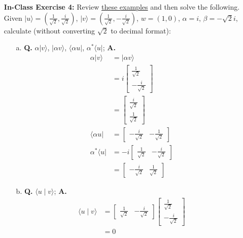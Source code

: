 \documentclass[main.tex]{subfiles}
\begin{document}
\begin{enumerate}
\item[] \textbf{In-Class Exercise 4:} Review \href{https://www2.seas.gwu.edu/~simhaweb/quantum/modules/module2/problems2.html#vectors}{these examples} and then solve the following. Given $|u\rangle=\left(\frac{1}{\sqrt{2}}, \frac{i}{\sqrt{2}}\right)$, $|v\rangle=\left(\frac{1}{\sqrt{2}}, -\frac{i}{\sqrt{2}}\right)$, $w=(1,0)$, $\alpha=i$, $\beta=-\sqrt{2}i$, calculate (without converting $\sqrt{2}$ to decimal format):

    \begin{enumerate}
        \item[a.] \textbf{Q.} $\alpha|v\rangle$, $|\alpha v\rangle$, $\langle\alpha u|$, $\alpha^{*}\langle u |$; \textbf{A.}
        \begin{align*}
            \alpha|v\rangle         & = |\alpha v\rangle\\ 
                                    & = i \left[\begin{array}{l}\frac{1}{\sqrt{2}}\\-\frac{i}{\sqrt{2}}\end{array}\right]\\ 
                                    & = \left[\begin{array}{l}\frac{i}{\sqrt{2}}\\\frac{1}{\sqrt{2}}\end{array}\right]\\
            \langle\alpha u|        & = \left[\begin{array}{ll} -\frac{i}{\sqrt{2}} & -\frac{1}{\sqrt{2}}\end{array}\right] \\
            \alpha^{*}\langle u |   &= -i \left[\begin{array}{ll} \frac{1}{\sqrt{2}} & -\frac{i}{\sqrt{2}}\end{array}\right] \\
                                    &= \left[\begin{array}{ll} -\frac{i}{\sqrt{2}} & \frac{1}{\sqrt{2}}\end{array}\right]
        \end{align*}
        
        \item[b.] \textbf{Q.} $\langle u \mid v\rangle$; \textbf{A.}
        \begin{align*}
            \langle u \mid v\rangle & = \left[\begin{array}{ll} \frac{1}{\sqrt{2}} & -\frac{i}{\sqrt{2}} \end{array}\right] \left[\begin{array}{r} \frac{1}{\sqrt{2}} \\ -\frac{i}{\sqrt{2}} \end{array}\right]\\
                                    & = 0
        \end{align*} 
        

\end{enumerate}
\end{enumerate}
\end{document}
